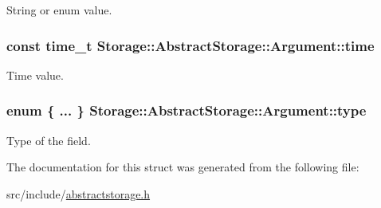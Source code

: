 \label{d9/dc9/structStorage_1_1AbstractStorage_1_1Argument_ab8ea8281cdefeb901a267261ed2e0478}
String or enum value. \hypertarget{structStorage_1_1AbstractStorage_1_1Argument_ae6cc69656647a6cccf725a0156373a51}{
\subsubsection[{time}]{\setlength{\rightskip}{0pt plus 5cm}const time\_\-t {\bf Storage::AbstractStorage::Argument::time}}}
\label{d9/dc9/structStorage_1_1AbstractStorage_1_1Argument_ae6cc69656647a6cccf725a0156373a51}
Time value. \hypertarget{structStorage_1_1AbstractStorage_1_1Argument_a77f04e835f26305c4222df78c07f8efd}{
\subsubsection[{type}]{\setlength{\rightskip}{0pt plus 5cm}enum \{ ... \}   {\bf Storage::AbstractStorage::Argument::type}}}
\label{d9/dc9/structStorage_1_1AbstractStorage_1_1Argument_a77f04e835f26305c4222df78c07f8efd}
Type of the field. 

The documentation for this struct was generated from the following file:\begin{DoxyCompactItemize}
\item 
src/include/\hyperlink{abstractstorage_8h}{abstractstorage.h}\end{DoxyCompactItemize}
